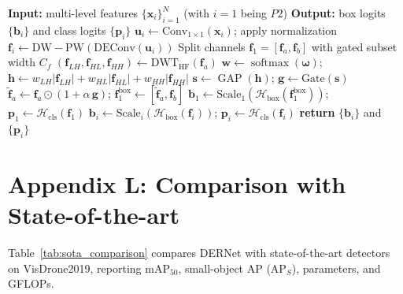 \documentclass{article}
\theoremstyle{plain}
\theoremstyle{definition}
\theoremstyle{remark}
\begin{document}
 \begin{algorithm}[H]
 \caption{FDHead forward pass (Frequency-Driven Head).}
 \label{alg:fdhead}
 \scriptsize
\begin{algorithmic}
   \STATE \textbf{Input:} multi-level features $\{\mathbf{x}_i\}_{i=1}^{N}$ (with $i=1$ being $P2$)
   \STATE \textbf{Output:} box logits $\{\mathbf{b}_i\}$ and class logits $\{\mathbf{p}_i\}$
     \STATE $\mathbf{u}_i \leftarrow \mathrm{Conv}_{1\times1}(\mathbf{x}_i)$; apply normalization
     \STATE $\mathbf{f}_i \leftarrow \mathrm{DW{-}PW}(\mathrm{DEConv}(\mathbf{u}_i))$ 
       \STATE Split channels $\mathbf{f}_1=[\mathbf{f}_a,\mathbf{f}_b]$ with gated subset width $C_f$
       \STATE $(\mathbf{f}_{LH},\mathbf{f}_{HL},\mathbf{f}_{HH}) \leftarrow \mathrm{DWT}_{\mathrm{HF}}(\mathbf{f}_a)$
       \STATE $\mathbf{w} \leftarrow \operatorname{softmax}(\boldsymbol{\omega})$; $\mathbf{h}\leftarrow w_{LH}|\mathbf{f}_{LH}|+w_{HL}|\mathbf{f}_{HL}|+w_{HH}|\mathbf{f}_{HH}|$
       \STATE $\mathbf{s} \leftarrow \operatorname{GAP}(\mathbf{h})$; $\mathbf{g} \leftarrow \mathrm{Gate}(\mathbf{s})$ 
       \STATE $\widetilde{\mathbf{f}}_a \leftarrow \mathbf{f}_a\odot(1+\alpha\,\mathbf{g})$; $\mathbf{f}^{\mathrm{box}}_1 \leftarrow [\widetilde{\mathbf{f}}_a,\mathbf{f}_b]$
       \STATE $\mathbf{b}_1 \leftarrow \mathrm{Scale}_1(\mathcal{H}_{\mathrm{box}}(\mathbf{f}^{\mathrm{box}}_1))$; $\mathbf{p}_1 \leftarrow \mathcal{H}_{\mathrm{cls}}(\mathbf{f}_1)$
     \ELSE
       \STATE $\mathbf{b}_i \leftarrow \mathrm{Scale}_i(\mathcal{H}_{\mathrm{box}}(\mathbf{f}_i))$; $\mathbf{p}_i \leftarrow \mathcal{H}_{\mathrm{cls}}(\mathbf{f}_i)$
     \ENDIF
   \ENDFOR
   \STATE \textbf{return} $\{\mathbf{b}_i\}$ and $\{\mathbf{p}_i\}$ 
 \end{algorithmic}
 \end{algorithm}

\section{Appendix L: Comparison with State-of-the-art}
\label{sec:appendix_sota}

Table~\ref{tab:sota_comparison} compares DERNet with state-of-the-art detectors on VisDrone2019, reporting mAP$_{50}$, small-object AP (AP$_S$), parameters, and GFLOPs.
\end{document}

